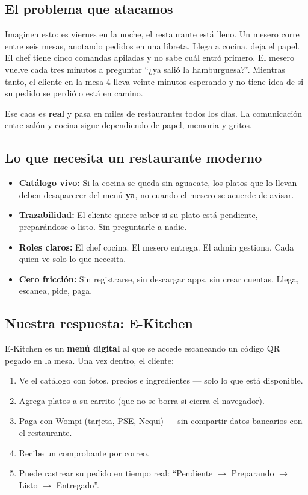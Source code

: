 \documentclass[12pt,a4paper]{article}
\begin{document}
\subsection{El problema que atacamos}

Imaginen esto: es viernes en la noche, el restaurante está lleno. Un mesero corre entre seis mesas, anotando pedidos en una libreta. Llega a cocina, deja el papel. El chef tiene cinco comandas apiladas y no sabe cuál entró primero. El mesero vuelve cada tres minutos a preguntar ``¿ya salió la hamburguesa?''. Mientras tanto, el cliente en la mesa 4 lleva veinte minutos esperando y no tiene idea de si su pedido se perdió o está en camino.

Ese caos es \textbf{real} y pasa en miles de restaurantes todos los días. La comunicación entre salón y cocina sigue dependiendo de papel, memoria y gritos.

\subsection{Lo que necesita un restaurante moderno}

\begin{itemize}[itemsep=2pt]
  \item \textbf{Catálogo vivo:} Si la cocina se queda sin aguacate, los platos que lo llevan deben desaparecer del menú \textbf{ya}, no cuando el mesero se acuerde de avisar.
  \item \textbf{Trazabilidad:} El cliente quiere saber si su plato está pendiente, preparándose o listo. Sin preguntarle a nadie.
  \item \textbf{Roles claros:} El chef cocina. El mesero entrega. El admin gestiona. Cada quien ve solo lo que necesita.
  \item \textbf{Cero fricción:} Sin registrarse, sin descargar apps, sin crear cuentas. Llega, escanea, pide, paga.
\end{itemize}

\subsection{Nuestra respuesta: E-Kitchen}

E-Kitchen es un \textbf{menú digital} al que se accede escaneando un código QR pegado en la mesa. Una vez dentro, el cliente:

\begin{enumerate}[itemsep=2pt]
  \item Ve el catálogo con fotos, precios e ingredientes — solo lo que está disponible.
  \item Agrega platos a su carrito (que no se borra si cierra el navegador).
  \item Paga con Wompi (tarjeta, PSE, Nequi) — sin compartir datos bancarios con el restaurante.
  \item Recibe un comprobante por correo.
  \item Puede rastrear su pedido en tiempo real: ``Pendiente $\rightarrow$ Preparando $\rightarrow$ Listo $\rightarrow$ Entregado''.
\end{enumerate}
\end{document}
